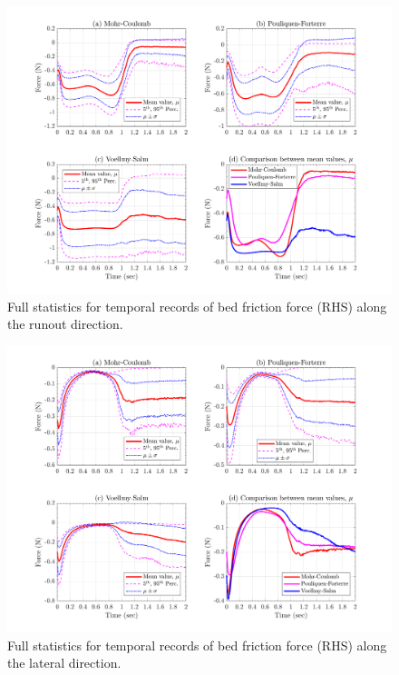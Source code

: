 \documentclass{article}
\begin{document}
\begin{figure}[H]
        \centering
        \includegraphics[width=1\textwidth]{InclinedPlane/GlobalRecords/Fbedx.png}
        \caption{Full statistics for temporal records of bed friction force (RHS) along the runout direction.}
        \label{fig:Ramp-Fbedx}
\end{figure}

\begin{figure}[H]
        \centering
        \includegraphics[width=1\textwidth]{InclinedPlane/GlobalRecords/Fbedy.png}
        \caption{Full statistics for temporal records of bed friction force (RHS) along the lateral direction.}
        \label{fig:Ramp-Fbedy}
\end{figure}
\end{document}
